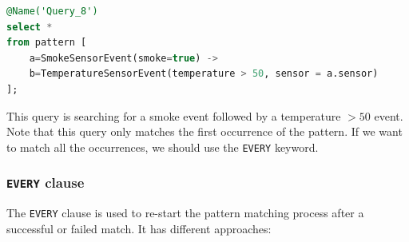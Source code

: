 \begin{lstlisting}[language=SQL]
@Name('Query_8')
select *
from pattern [
    a=SmokeSensorEvent(smoke=true) ->
    b=TemperatureSensorEvent(temperature > 50, sensor = a.sensor)
];
\end{lstlisting}

This query is searching for a smoke event followed by a temperature $> 50$ event.
Note that this query only matches the first occurrence of the pattern. If we want
to match all the occurrences, we should use the \texttt{EVERY} keyword.

\subsubsection{\texttt{EVERY} clause}

The \texttt{EVERY} clause is used to re-start the pattern matching process after
a successful or failed match. It has different approaches:

